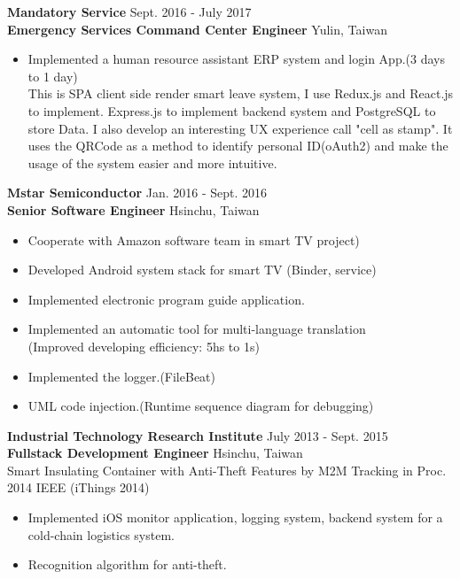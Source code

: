 \documentclass{res}
\begin{document}
\begin{resume}
				{\bf Mandatory Service}			 {\hfill Sept. 2016 - July 2017}\\
				{\bf Emergency Services Command Center Engineer}   {\hfill Yulin, Taiwan}
				\begin{itemize}
					\item Implemented a human resource assistant ERP system and login App.(3 days to 1 day)
					\\  This is SPA client side render smart leave system, I use Redux.js and React.js to implement. Express.js to implement backend system and PostgreSQL to store Data. I also develop an interesting UX experience call  "cell as stamp". It uses the QRCode as a method to identify personal ID(oAuth2) and make the usage of the system easier and more intuitive.
				\end{itemize}
				\vspace{-0.10in}


				{\bf Mstar Semiconductor} 		 {\hfill Jan. 2016 - Sept. 2016}\\
				{\bf Senior Software Engineer}		 {\hfill Hsinchu, Taiwan}

				\begin{itemize}
					\item Cooperate with Amazon software team in smart TV project)
					\vspace{-0.05in}
					\item Developed Android system stack for smart TV (Binder, service)
					\vspace{-0.05in}
					\item Implemented electronic program guide application.
					\vspace{-0.05in}
					\item Implemented an automatic tool for multi-language translation \\(Improved developing efficiency: 5hs to 1s)
					\vspace{-0.05in}
					\item Implemented the logger.(FileBeat)
					\vspace{-0.05in}
					\item UML code injection.(Runtime sequence diagram for debugging)
				\end{itemize}
				\vspace{-0.10in}
				{\bf Industrial Technology Research Institute } {\hfill July 2013 - Sept. 2015}\\
				{\bf Fullstack Development Engineer}                        {\hfill Hsinchu, Taiwan}\\
				Smart Insulating Container with Anti-Theft Features by M2M Tracking {\footnotesize in Proc. 2014 IEEE (iThings 2014)}
				\vspace{0.05in}
				\begin{itemize}
					\item Implemented iOS monitor application, logging system, backend system for a cold-chain logistics system.
					\vspace{-0.05in}
					\item Recognition algorithm for anti-theft.
				\end{itemize}
				\vspace{-0.10in}


\end{resume}
\end{document}
